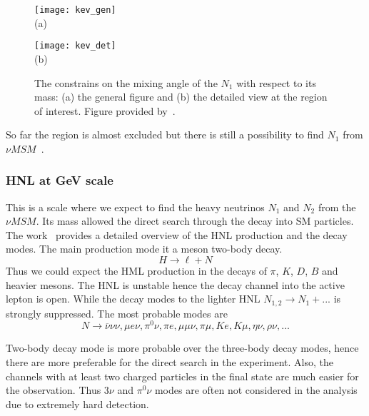 \documentclass[../main.tex]{subfiles}
\begin{document}
\begin{figure}[!ht]
  \centering
  \begin{minipage}{0.49\linewidth}
    \centering
    \texttt{[image: kev\_gen]} \\ (a)
  \end{minipage}
  \begin{minipage}{0.49\linewidth}
    \centering
    \texttt{[image: kev\_det]} \\ (b)
  \end{minipage}
  \caption{The constrains on the mixing angle of the $N_1$ with respect to its mass: (a) the general figure and (b) the detailed view at the region of interest. Figure provided by~\cite{Perez2017}.}
  \label{fig:intro:hnl_kev}
\end{figure}

So far the region is almost excluded but there is still a possibility to find $N_1$ from $\nu MSM$~\cite{Caputo2020}.

\subsubsection{HNL at GeV scale}
This is a scale where we expect to find the heavy neutrinos $N_1$ and $N_2$ from the $\nu MSM$. Its mass allowed the direct search through the decay into SM particles. The work~\cite{Gorbunov2007} provides a detailed overview of the HNL production and the decay modes. The main production mode it a meson two-body decay.
\begin{equation}
H\to\ell+N
\end{equation}
Thus we could expect the HML production in the decays of $\pi$, $K$, $D$, $B$ and heavier mesons. The HNL is unstable hence the decay channel into the active lepton is open. While the decay modes to the lighter HNL $N_{1,2}\to N_1+...$ is strongly suppressed. The most probable modes are
\begin{equation}
N\to\overline{\nu}\nu\nu, \mu e\nu, \pi^0\nu, \pi e, \mu\mu\nu, \pi\mu, Ke, K\mu, \eta\nu, \rho\nu,...
\end{equation}

Two-body decay mode is more probable over the three-body decay modes, hence there are more preferable for the direct search in the experiment. Also, the channels with at least two charged particles in the final state are much easier for the observation. Thus $3\nu$ and $\pi^0\nu$ modes are often not considered in the analysis due to extremely hard detection.
\end{document}
